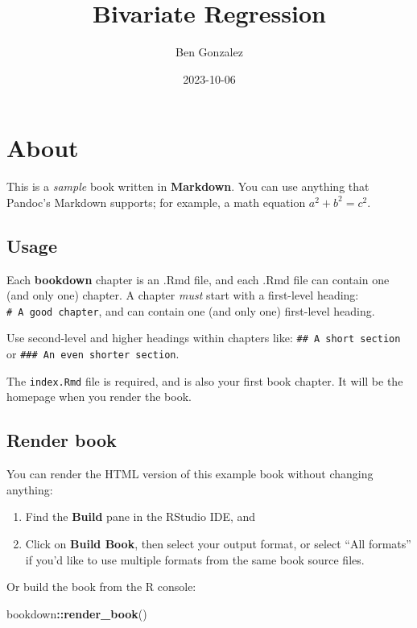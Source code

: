 \documentclass[
]{book}
\title{Bivariate Regression}
\author{Ben Gonzalez}
\date{2023-10-06}
\newenvironment{Shaded}{\begin{snugshade}}{\end{snugshade}}
\newcommand{\FunctionTok}[1]{\textcolor[rgb]{0.13,0.29,0.53}{\textbf{#1}}}
\newcommand{\NormalTok}[1]{#1}
\newcommand{\SpecialCharTok}[1]{\textcolor[rgb]{0.81,0.36,0.00}{\textbf{#1}}}
\theoremstyle{definition}
\theoremstyle{definition}
\theoremstyle{definition}
\theoremstyle{definition}
\theoremstyle{remark}
\begin{document}
\maketitle

{
\setcounter{tocdepth}{1}
\tableofcontents
}
\hypertarget{about}{%
\chapter{About}\label{about}}

This is a \emph{sample} book written in \textbf{Markdown}. You can use anything that Pandoc's Markdown supports; for example, a math equation \(a^2 + b^2 = c^2\).

\hypertarget{usage}{%
\section{Usage}\label{usage}}

Each \textbf{bookdown} chapter is an .Rmd file, and each .Rmd file can contain one (and only one) chapter. A chapter \emph{must} start with a first-level heading: \texttt{\#\ A\ good\ chapter}, and can contain one (and only one) first-level heading.

Use second-level and higher headings within chapters like: \texttt{\#\#\ A\ short\ section} or \texttt{\#\#\#\ An\ even\ shorter\ section}.

The \texttt{index.Rmd} file is required, and is also your first book chapter. It will be the homepage when you render the book.

\hypertarget{render-book}{%
\section{Render book}\label{render-book}}

You can render the HTML version of this example book without changing anything:

\begin{enumerate}
\def\labelenumi{\arabic{enumi}.}
\item
  Find the \textbf{Build} pane in the RStudio IDE, and
\item
  Click on \textbf{Build Book}, then select your output format, or select ``All formats'' if you'd like to use multiple formats from the same book source files.
\end{enumerate}

Or build the book from the R console:

\begin{Shaded}
\begin{Highlighting}[]
\NormalTok{bookdown}\SpecialCharTok{::}\FunctionTok{render\_book}\NormalTok{()}
\end{Highlighting}
\end{Shaded}
\end{document}
